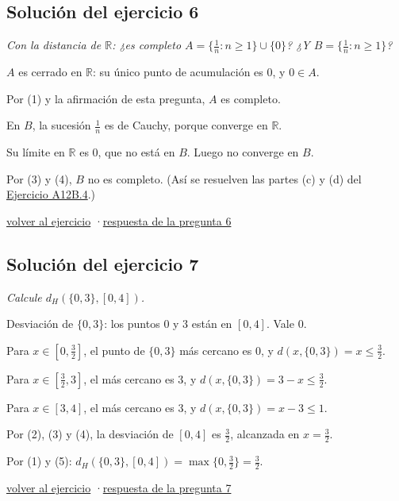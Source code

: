 \documentclass[11pt,a4paper]{article}
\newcommand{\R}{\mathbb{R}}\newcommand{\N}{\mathbb{N}}\newcommand{\Q}{\mathbb{Q}}
\begin{document}
\subsection*{\hypertarget{s-6}{}Solución del ejercicio 6}
\emph{Con la distancia de $\R$: ¿es completo $A=\{\frac1n:n\ge1\}\cup\{0\}$? ¿Y $B=\{\frac1n:n\ge1\}$?}
\begin{pasos}
\item[(1)] $A$ es cerrado en $\R$: su único punto de acumulación es $0$, y $0\in A$.
\item[(2)] Por (1) y la afirmación de esta pregunta, $A$ es completo.
\item[(3)] En $B$, la sucesión $\frac1n$ es de Cauchy, porque converge en $\R$.
\item[(4)] Su límite en $\R$ es $0$, que no está en $B$. Luego no converge en $B$.
\item[] Por (3) y (4), $B$ no es completo. (Así se resuelven las partes (c) y (d) del \href{https://decostruttivismo.github.io/MAT2514-repaso/pdf/MAT2514_apuntes_completos.pdf\#nameddest=ejercicio.A12B.4}{Ejercicio A12B.4}.)
\end{pasos}
\par{\small \hyperlink{x-6}{volver al ejercicio} \quad·\quad \hyperlink{r-6}{respuesta de la pregunta 6}}
\subsection*{\hypertarget{s-7}{}Solución del ejercicio 7}
\emph{Calcule $d_H(\{0,3\},[0,4])$.}
\begin{pasos}
\item[(1)] Desviación de $\{0,3\}$: los puntos $0$ y $3$ están en $[0,4]$. Vale $0$.
\item[(2)] Para $x\in[0,\frac32]$, el punto de $\{0,3\}$ más cercano es $0$, y $d(x,\{0,3\})=x\le\frac32$.
\item[(3)] Para $x\in[\frac32,3]$, el más cercano es $3$, y $d(x,\{0,3\})=3-x\le\frac32$.
\item[(4)] Para $x\in[3,4]$, el más cercano es $3$, y $d(x,\{0,3\})=x-3\le1$.
\item[(5)] Por (2), (3) y (4), la desviación de $[0,4]$ es $\frac32$, alcanzada en $x=\frac32$.
\item[] Por (1) y (5): $d_H(\{0,3\},[0,4])=\max\{0,\frac32\}=\frac32$.
\end{pasos}
\par{\small \hyperlink{x-7}{volver al ejercicio} \quad·\quad \hyperlink{r-7}{respuesta de la pregunta 7}}
\end{document}
